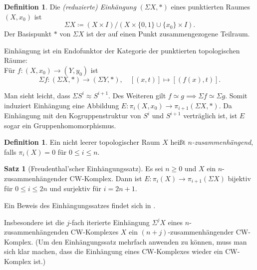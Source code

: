\documentclass[11pt, a4paper, german]{article}
\theoremstyle{definition}
\newtheorem{satz}[lem]{Satz}
\newtheorem{defn}[lem]{Definition}
\theoremstyle{remark}
\newcommand{\homeo}{\approx} %
\begin{document}
\begin{defn}
  Die \emph{(reduzierte) Einhängung} $(\Sigma X, *)$ eines punktierten Raumes $(X, x_0)$ ist
  \[ \Sigma X \coloneqq (X \times I) / (X \times \{ 0, 1 \} \cup \{ x_0 \} \times I). \]
  Der Basispunkt $*$ von $\Sigma X$ ist der auf einen Punkt zusammengezogene Teilraum.
\end{defn}

Einhängung ist ein Endofunktor der Kategorie der punktierten topologischen Räume: \\
Für $f : (X, x_0) \to (Y, y_0)$ ist
\[
  \Sigma f : (\Sigma X, *) \to (\Sigma Y, *), \quad
  [(x, t)] \mapsto [(f(x), t)].
\]

Man sieht leicht, dass $\Sigma S^i \homeo S^{i+1}$.
Des Weiteren gilt $f \simeq g \implies \Sigma f \simeq \Sigma g$.
Somit induziert Einhängung eine Abbildung $E : \pi_i(X, x_0) \to \pi_{i+1}(\Sigma X, *)$.
Da Einhängung mit den Kogruppenstruktur von $S^i$ und $S^{i+1}$ verträglich ist, ist $E$ sogar ein Gruppenhomomorphismus.

\begin{defn}
  Ein nicht leerer topologischer Raum $X$ heißt \emph{$n$-zusammenhängend}, falls $\pi_i(X) = 0$ für $0 \leq i \leq n$.
\end{defn}

\begin{satz}[Freudenthal'scher Einhängungssatz]
  Es sei $n \geq 0$ und $X$ ein $n$-zusammenhängender CW-Komplex.
  Dann ist $E : \pi_i(X) \to \pi_{i+1}(\Sigma X)$ bijektiv für $0 \leq i \leq 2n$ und surjektiv für $i = 2n + 1$.
\end{satz}

Ein Beweis des Einhängungssatzes findet sich in \cite[Kor 4.24]{hatcher:at}.

Insbesondere ist die $j$-fach iterierte Einhängung $\Sigma^j X$ eines $n$-zusammenhängenden CW-Komplexes $X$ ein $(n{+}j)$-zusammenhängender CW-Komplex. (Um den Einhängungssatz mehrfach anwenden zu können, muss man sich klar machen, dass die Einhängung eines CW-Komplexes wieder ein CW-Komplex ist.)
\end{document}
